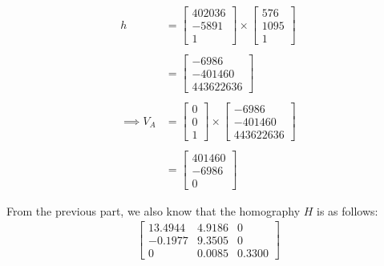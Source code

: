 \documentclass[12pt, oneside]{article}
\begin{document}
\begin{align*}
h   &=  \begin{bmatrix} 402036  \\ -5891 \\ 1  \end{bmatrix} \times 
        \begin{bmatrix} 576   \\ 1095   \\   1   \end{bmatrix} \\ \\
    &=  \begin{bmatrix} -6986   \\ -401460   \\ 443622636   \end{bmatrix}  \\ \\   
\implies V_A  &=  \begin{bmatrix} 0   \\ 0   \\ 1   \end{bmatrix} \times  
        \begin{bmatrix} -6986   \\ -401460   \\ 443622636 \end{bmatrix} \\ \\
    &=  \begin{bmatrix} 401460   \\ -6986   \\ 0   \end{bmatrix} 
\end{align*}

From the previous part, we also know that the homography $H$ is as follows:
\begin{align*}
\begin{bmatrix}
    13.4944     &  4.9186   & 0 \\
    -0.1977     &  9.3505   & 0 \\
    0           & 0.0085  & 0.3300
\end{bmatrix}
\end{align*}
\end{document}
